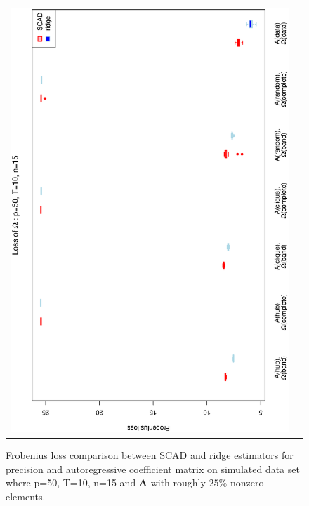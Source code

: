 \begin{figure}[h!]
\begin{tabular}{cc}
\includegraphics[scale=0.45,angle=270]{LossOmega50T10N15_25.eps}
\end{tabular}
\caption{Frobenius loss comparison between SCAD and ridge estimators for precision and autoregressive coefficient matrix on simulated data set where p=50, T=10, n=15 and $\mathbf{A}$ with roughly $25\%$ nonzero elements.}
\label{figSM:Loss50T10N15_25}
\end{figure}



